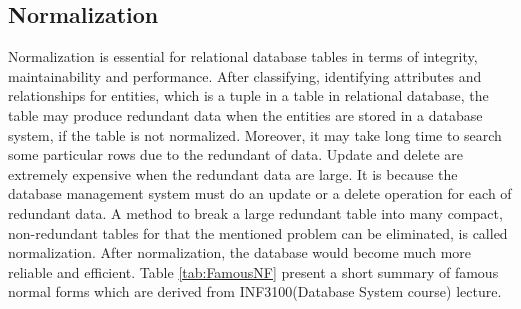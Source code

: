 \subsection{Normalization}
Normalization is essential for relational database tables in terms of integrity, maintainability and performance. After classifying, identifying attributes and relationships for entities, which is a tuple in a table in relational database, the table may produce redundant data when the entities are stored in a database system, if the table is not normalized. Moreover, it may take long time to search some particular rows due to the redundant of data. Update and delete are extremely expensive when the redundant data are large. It is because the database management system must do an update or a delete operation for each of redundant data. A method to break a large redundant table into many compact, non-redundant tables for that the mentioned problem can be eliminated, is called normalization. After normalization, the database would become much more reliable and efficient. Table \ref{tab:FamousNF} present a short summary of famous normal forms which are derived from INF3100(Database System course)\cite{INF3100} lecture.
